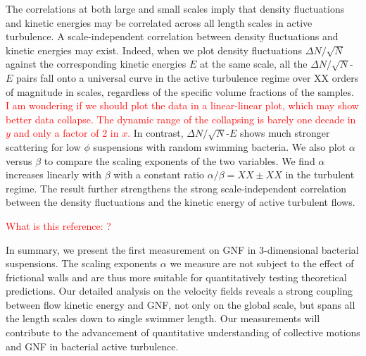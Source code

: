\documentclass[twocolumn,aps,prl,amsmath,amssymb,longbibliography]{revtex4-2}
\begin{document}
The correlations at both large and small scales imply that density fluctuations and kinetic energies may be correlated across all length scales in active turbulence. A scale-independent correlation between density fluctuations and kinetic energies may exist. Indeed, when we plot density fluctuations $\Delta N/\sqrt N$ against the corresponding kinetic energies $E$ at the same scale, all the $\Delta N/\sqrt N$-$E$ pairs fall onto a universal curve in the active turbulence regime over XX orders of magnitude in scales, regardless of the specific volume fractions of the samples. \textcolor{red}{I am wondering if we should plot the data in a linear-linear plot, which may show better data collapse. The dynamic range of the collapsing is barely one decade in $y$ and only a factor of 2 in $x$.} In contrast, $\Delta N/\sqrt N$-$E$ shows much stronger scattering for low $\phi$ suspensions with random swimming bacteria. We also plot $\alpha$ versus $\beta$ to compare the scaling exponents of the two variables. We find $\alpha$ increases linearly with $\beta$ with a constant ratio $\alpha/\beta = XX \pm XX$ in the turbulent regime. The result further strengthens the strong scale-independent correlation between the density fluctuations and the kinetic energy of active turbulent flows.

\textcolor{red}{What is this reference: \cite{Chatterjee2019}?}






In summary, we present the first measurement on GNF in 3-dimensional bacterial suspensions. The scaling exponents $\alpha$ we measure are not subject to the effect of frictional walls and are thus more suitable for quantitatively testing theoretical predictions.
Our detailed analysis on the velocity fields reveals a strong coupling between flow kinetic energy and GNF, not only on the global scale, but spans all the length scales down to single swimmer length.
Our measurements will contribute to the advancement of quantitative understanding of collective motions and GNF in bacterial active turbulence.



\end{document}
